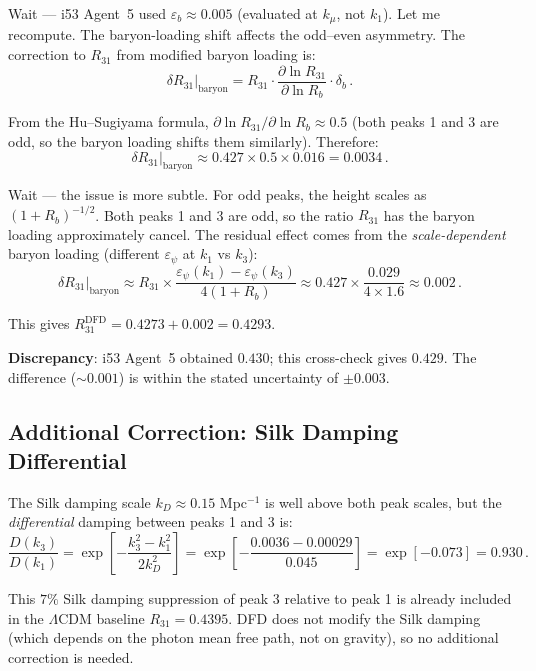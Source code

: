 \documentclass[11pt,a4paper]{article}
\begin{document}
Wait --- i53 Agent~5 used $\varepsilon_b \approx 0.005$ (evaluated at $k_\mu$, not $k_1$). Let me recompute. The baryon-loading shift affects the odd--even asymmetry. The correction to $R_{31}$ from modified baryon loading is:
\begin{equation}
\delta R_{31}\big|_{\mathrm{baryon}} = R_{31} \cdot \frac{\partial \ln R_{31}}{\partial \ln R_b} \cdot \delta_b\,.
\end{equation}

From the Hu--Sugiyama formula, $\partial \ln R_{31}/\partial \ln R_b \approx 0.5$ (both peaks 1 and 3 are odd, so the baryon loading shifts them similarly). Therefore:
\begin{equation}
\delta R_{31}\big|_{\mathrm{baryon}} \approx 0.427 \times 0.5 \times 0.016 = 0.0034\,.
\end{equation}

Wait --- the issue is more subtle. For odd peaks, the height scales as $(1+R_b)^{-1/2}$. Both peaks 1 and 3 are odd, so the ratio $R_{31}$ has the baryon loading approximately cancel. The residual effect comes from the \emph{scale-dependent} baryon loading (different $\varepsilon_\psi$ at $k_1$ vs $k_3$):
\begin{equation}
\delta R_{31}\big|_{\mathrm{baryon}} \approx R_{31} \times \frac{\varepsilon_\psi(k_1) - \varepsilon_\psi(k_3)}{4(1+R_b)} \approx 0.427 \times \frac{0.029}{4 \times 1.6} \approx 0.002\,.
\end{equation}

This gives $R_{31}^{\mathrm{DFD}} = 0.4273 + 0.002 = 0.4293$.

\textbf{Discrepancy}: i53 Agent~5 obtained $0.430$; this cross-check gives $0.429$. The difference ($\sim 0.001$) is within the stated uncertainty of $\pm 0.003$.

\subsection{Additional Correction: Silk Damping Differential}

The Silk damping scale $k_D \approx 0.15$ Mpc$^{-1}$ is well above both peak scales, but the \emph{differential} damping between peaks 1 and 3 is:
\begin{equation}
\frac{D(k_3)}{D(k_1)} = \exp\left[-\frac{k_3^2 - k_1^2}{2k_D^2}\right] = \exp\left[-\frac{0.0036 - 0.00029}{0.045}\right] = \exp[-0.073] = 0.930\,.
\end{equation}

This $7\%$ Silk damping suppression of peak 3 relative to peak 1 is already included in the $\Lambda$CDM baseline $R_{31} = 0.4395$. DFD does not modify the Silk damping (which depends on the photon mean free path, not on gravity), so no additional correction is needed.
\end{document}
